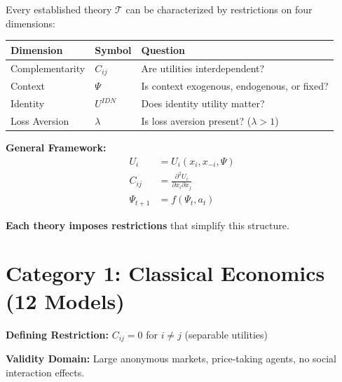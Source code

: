 Every established theory $\mathcal{T}$ can be characterized by restrictions on
four dimensions:

\begin{tcolorbox}[colback=blue!5!white, colframe=blue!75!black,
    title=\textbf{The Four Restriction Dimensions}]

\begin{tabular}{@{}lll@{}}
\textbf{Dimension} & \textbf{Symbol} & \textbf{Question} \\
\midrule
Complementarity & $C_{ij}$ & Are utilities interdependent? \\
Context & $\Psi$ & Is context exogenous, endogenous, or fixed? \\
Identity & $U^{IDN}$ & Does identity utility matter? \\
Loss Aversion & $\lambda$ & Is loss aversion present? ($\lambda > 1$) \\
\end{tabular}

\medskip
\textbf{General Framework:}
\begin{align}
U_i &= U_i(x_i, x_{-i}, \Psi) \\
C_{ij} &= \frac{\partial^2 U_i}{\partial x_i \partial x_j} \\
\Psi_{t+1} &= f(\Psi_t, a_t)
\end{align}

\textbf{Each theory imposes restrictions} that simplify this structure.

\end{tcolorbox}

\section{Category 1: Classical Economics (12 Models)}
\label{sec:ms-classical}

\begin{tcolorbox}[colback=gray!5!white, colframe=gray!75!black,
    title=\textbf{Classical Economics: The Separability Restriction}]

\textbf{Defining Restriction:} $C_{ij} = 0$ for $i \neq j$ (separable utilities)

\textbf{Validity Domain:} Large anonymous markets, price-taking agents,
no social interaction effects.

\end{tcolorbox}

